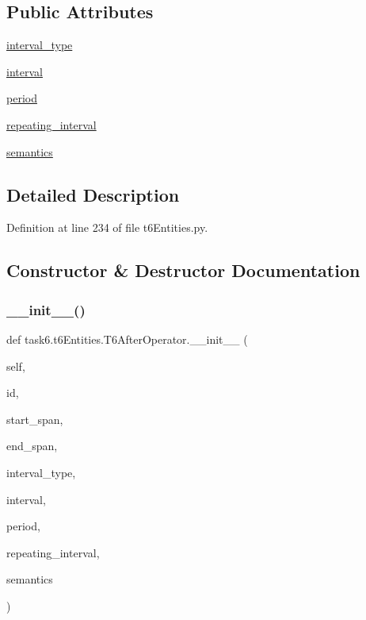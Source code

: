 \subsection*{Public Attributes}
\begin{DoxyCompactItemize}
\item 
\hyperlink{classtask6_1_1t6Entities_1_1T6AfterOperator_a4cecc35aaca42a517e7a8c3a23062b73}{interval\+\_\+type}
\item 
\hyperlink{classtask6_1_1t6Entities_1_1T6AfterOperator_a33c6453eb324ed64a62025d823329304}{interval}
\item 
\hyperlink{classtask6_1_1t6Entities_1_1T6AfterOperator_abb2b91e9891f20ec388cbc9d6038c3a7}{period}
\item 
\hyperlink{classtask6_1_1t6Entities_1_1T6AfterOperator_aa3611005a94f1cbc3867c3e3c9463d24}{repeating\+\_\+interval}
\item 
\hyperlink{classtask6_1_1t6Entities_1_1T6AfterOperator_a9a0d8b1907a272fa065b80fdd8a533a8}{semantics}
\end{DoxyCompactItemize}


\subsection{Detailed Description}


Definition at line 234 of file t6\+Entities.\+py.



\subsection{Constructor \& Destructor Documentation}
\mbox{\label{classtask6_1_1t6Entities_1_1T6AfterOperator_aec577149362a92ed1cf1e5bbdc0521c1}} 
\subsubsection{\texorpdfstring{\+\_\+\+\_\+init\+\_\+\+\_\+()}{\_\_init\_\_()}}
{\footnotesize\ttfamily def task6.\+t6\+Entities.\+T6\+After\+Operator.\+\_\+\+\_\+init\+\_\+\+\_\+ (\begin{DoxyParamCaption}\item[{}]{self,  }\item[{}]{id,  }\item[{}]{start\+\_\+span,  }\item[{}]{end\+\_\+span,  }\item[{}]{interval\+\_\+type,  }\item[{}]{interval,  }\item[{}]{period,  }\item[{}]{repeating\+\_\+interval,  }\item[{}]{semantics }\end{DoxyParamCaption})}



